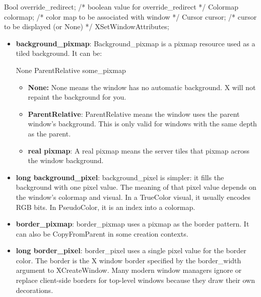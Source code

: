 \documentclass{report}
\begin{document}
\begin{itemize}
\begin{cppcode}
{                    Bool override_redirect;         /* boolean value for override_redirect */
                    Colormap colormap;              /* color map to be associated with window */
                    Cursor cursor;                  /* cursor to be displayed (or None) */
                } XSetWindowAttributes;
            \end{cppcode}
            \bigbreak \noindent
            \begin{itemize}
                \item \textbf{background\_pixmap}: Background\_pixmap is a pixmap resource used as a tiled background. It can be:
                    \bigbreak \noindent 
                    \begin{cppcode}
                        None
                        ParentRelative
                        some_pixmap
                    \end{cppcode}
                    \bigbreak \noindent
                    \begin{itemize}
                        \item \textbf{None:} None means the window has no automatic background. X will not repaint the background for you.
                        \item \textbf{ParentRelative}: ParentRelative means the window uses the parent window’s background. This is only valid for windows with the same depth as the parent.
                        \item \textbf{real pixmap}: A real pixmap means the server tiles that pixmap across the window background.
                    \end{itemize}
                \item \textbf{long background\_pixel}: background\_pixel is simpler: it fills the background with one pixel value. The meaning of that pixel value depends on the window’s colormap and visual. In a TrueColor visual, it usually encodes RGB bits. In PseudoColor, it is an index into a colormap.
                \item \textbf{border\_pixmap}: border\_pixmap uses a pixmap as the border pattern. It can also be CopyFromParent in some creation contexts.
                \item \textbf{long border\_pixel}: border\_pixel uses a single pixel value for the border color.
                    \bigbreak \noindent 
                    The border is the X window border specified by the border\_width argument to XCreateWindow. Many modern window managers ignore or replace client-side borders for top-level windows because they draw their own decorations.

\end{itemize}
\end{itemize}
\end{document}
